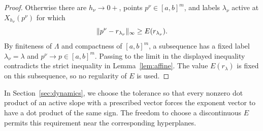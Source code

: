 \begin{proof}
Otherwise there are $h_\nu\to0+$, points $p^\nu\in[a,b]^m$, and
labels $\lambda_\nu$ active at $X_{h_\nu}(p^\nu)$ for which
\[
 \lVert p^\nu-r_{\lambda_\nu}\rVert_\infty
 \ge E(r_{\lambda_\nu}).
\]
By finiteness of $\Lambda$ and compactness of $[a,b]^m$, a subsequence
has a fixed label $\lambda_\nu=\lambda$ and $p^\nu\to p\in[a,b]^m$.
Passing to the limit in the displayed inequality contradicts the strict
inequality in Lemma~\ref{lem:affine}. The value $E(r_\lambda)$ is fixed
on this subsequence, so no regularity of $E$ is used.
\end{proof}

In Section~\ref{sec:dynamics}, we choose the tolerance so that every
nonzero dot product of an active slope with a prescribed vector forces
the exponent vector to have a dot product of the same sign. The freedom
to choose a discontinuous $E$ permits this requirement near the corresponding
hyperplanes.
